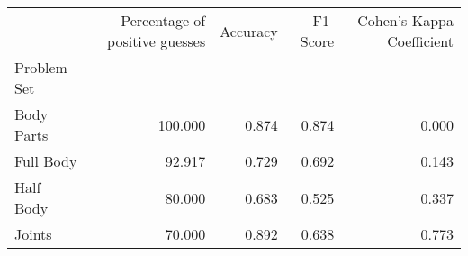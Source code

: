 \begin{table}
    \caption[]{}
    \label{}
    \begin{tabular}{lrrrr}
\hline
{} &  Percentage of positive guesses &  Accuracy &  F1-Score &  Cohen's Kappa Coefficient \\
Problem Set   &                                 &           &           &                            \\
\hline
Body Parts &                         100.000 &     0.874 &     0.874 &                      0.000 \\
Full Body  &                          92.917 &     0.729 &     0.692 &                      0.143 \\
Half Body  &                          80.000 &     0.683 &     0.525 &                      0.337 \\
Joints     &                          70.000 &     0.892 &     0.638 &                      0.773 \\
\hline
\end{tabular}

\end{table}